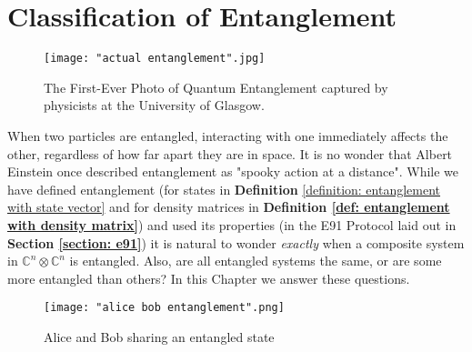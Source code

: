 
\chapter{Classification of Entanglement} %

\label{Chapter6-classification of entanglement} %
\begin{figure}[h]
    \centering
    \texttt{[image: "actual entanglement".jpg]}
    \caption{The First-Ever Photo of Quantum Entanglement captured by physicists at the University of Glasgow. \cite{moreau2019imaging}}
    \label{fig:actual entanglemen}
\end{figure}

When two particles are entangled, interacting with one immediately affects the other, regardless of how far apart they are in space.  It is no wonder that Albert Einstein once described entanglement as "spooky action at a distance". While we have defined entanglement (for states in {\bf{Definition}} \ref{definition: entanglement with state vector} and for density matrices in \textbf{Definition \ref{def: entanglement with density matrix}}) and used its properties (in the E91 Protocol laid out in \textbf{Section \ref{section: e91}}) it is natural to wonder {\emph{exactly}} when a composite system in $\mathbb{C}^n \otimes \mathbb{C}^n$ is entangled.
Also, are all entangled systems the same, or are some more entangled than others?  In this Chapter we answer these questions.


\begin{figure}[h]
    \centering
    \texttt{[image: "alice bob entanglement".png]}
    \caption{Alice and Bob sharing an entangled state}
    \label{fig:entanglement}
\end{figure}


